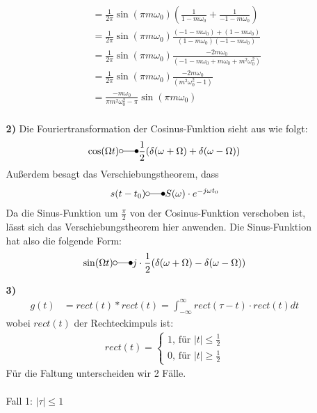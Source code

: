 \documentclass[a4paper,11pt]{article}
\begin{document}
\begin{enumerate}
\begin{enumerate}
\begin{enumerate}
\begin{align*}
					   &=\frac{1}{2\pi}\sin(\pi m\omega_0)(\frac{1}{1- m\omega_0}+\frac{1}{-1-m\omega_0})\\
					   &=\frac{1}{2\pi}\sin(\pi m\omega_0)\frac{(-1-m\omega_0)+(1- m\omega_0)}{(1- m\omega_0)(-1-m\omega_0)}\\
					   &=\frac{1}{2\pi}\sin(\pi m\omega_0)\frac{-2m\omega_0}{(-1-m\omega_0+m\omega_0+m^2\omega_0^2)}\\
					   &=\frac{1}{2\pi}\sin(\pi m\omega_0)\frac{-2m\omega_0}{(m^2\omega_0^2-1)}\\
					   &=\frac{-m\omega_0}{\pi m^2\omega_0^2-\pi}\sin(\pi m\omega_0)\\
				\end{align*}
				\end{enumerate}
			\item[\textbf{2)}]
			Die Fouriertransformation der Cosinus-Funktion sieht aus wie folgt:
			\begin{align*}
			\cos(\Omega t) \laplace \frac{1}{2}(\delta(\omega + \Omega)+\delta(\omega - \Omega))
			\end{align*}
			Außerdem besagt das Verschiebungstheorem, dass
			\begin{align*}
			s(t-t_0) \laplace S(\omega) \cdot e^{-j\omega t_0}
			\end{align*}
			Da die Sinus-Funktion um $\frac{\pi}{2}$ von der Cosinus-Funktion verschoben ist, lässt sich das Verschiebungstheorem hier anwenden. Die Sinus-Funktion hat also die folgende Form:
			\begin{align*}
			\sin(\Omega t) \laplace j \cdot \frac{1}{2}(\delta(\omega + \Omega)-\delta(\omega - \Omega))
			\end{align*}
			\item[\textbf{3)}]
			\begin{align*}
			g(t) &= rect(t) * rect(t) = \int_{- \infty}^{\infty}rect(\tau - t)\cdot rect(t)dt
			\end{align*}
			wobei $rect(t)$ der Rechteckimpuls ist:
			\begin{align*}
			rect(t) = 
			\begin{cases}
			1 \text{, für } |t| \leq \frac{1}{2} \\
			0 \text{, für } |t| \geq \frac{1}{2}
			\end{cases}
			\end{align*}
			Für die Faltung unterscheiden wir 2 Fälle. \\ \\
			Fall 1: $|\tau| \le 1$ \\
			\begin{align*}

\end{align*}
\end{enumerate}
\end{enumerate}
\end{document}
